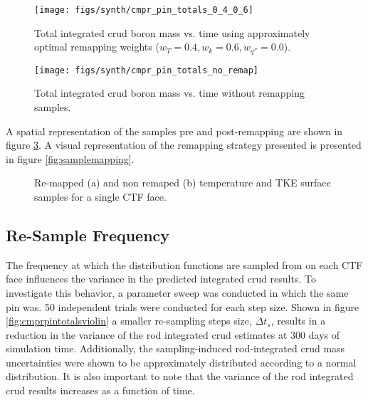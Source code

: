 \begin{figure}[H]
    \centering
    \texttt{[image: figs/synth/cmpr\_pin\_totals\_0\_4\_0\_6]}
    \caption[Total integrated crud boron mass vs. time using approximately optimal remapping weights.]{Total integrated crud boron mass vs. time using approximately optimal remapping weights ($w_T=0.4, w_{k}=0.6, w_{q''}=0.0$).}
    \label{fig:cmprpintotals0406}
\end{figure}
\begin{figure}[H]
    \centering
    \texttt{[image: figs/synth/cmpr\_pin\_totals\_no\_remap]}
    \caption{Total integrated crud boron mass vs. time without remapping samples.}
    \label{fig:cmprpintotalsnoremap}
\end{figure}

A spatial representation of the samples pre and post-remapping are shown in figure \ref{fig:remmap_comp}.  A visual representation of the remapping strategy presented is presented in figure \ref{fig:samplemapping}.

\begin{figure}[H]%
    \centering
    \qquad
    \caption[Re-mapped and non remaped temperature and TKE surface samples]{Re-mapped (a) and non remaped (b) temperature and TKE surface samples for a single CTF face.}%
    \label{fig:remmap_comp}%
\end{figure}

\subsection{Re-Sample Frequency}
\label{sec:resample_freq_study}

The frequency at which the distribution functions are sampled from on each CTF face influences the variance in the predicted integrated crud results.  To investigate this behavior, a parameter sweep was conducted in which the same pin was.  50 independent trials were conducted for each step size.  Shown in figure \ref{fig:cmprpintotalsviolin} a smaller re-sampling steps size, $\Delta t_s$, results in a reduction in the variance of the rod integrated crud estimates at 300 days of simulation time.   Additionally, the sampling-induced rod-integrated crud mass uncertainties were shown to be approximately distributed according to a normal distribution.  It is also important to note that the variance of the rod integrated crud results increases as a function of time.

